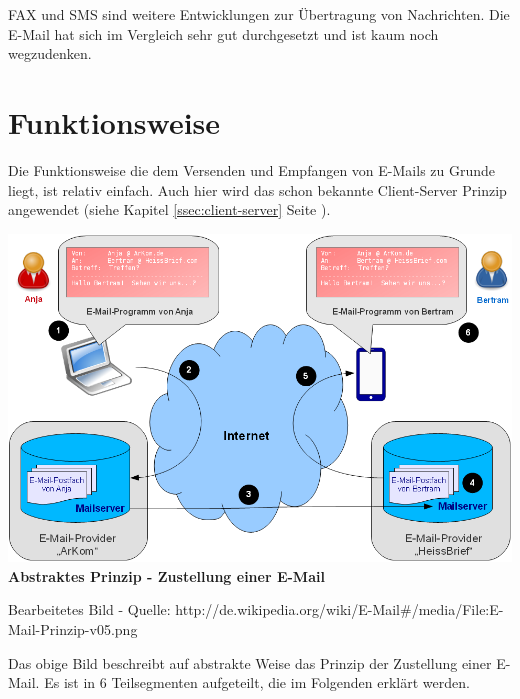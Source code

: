 \documentclass[12pt,a4paper]{report}
\begin{document}
\begin{onehalfspace}
FAX und SMS sind weitere Entwicklungen zur Übertragung von Nachrichten. Die E-Mail hat sich im Vergleich sehr gut durchgesetzt und ist kaum noch wegzudenken. 
\section{Funktionsweise}
Die Funktionsweise die dem Versenden und Empfangen von E-Mails zu Grunde liegt, ist relativ einfach. Auch hier wird das schon bekannte Client-Server Prinzip angewendet (siehe Kapitel \ref{ssec:client-server} Seite \pageref{ssec:client-server}).\\

\begin{center}
\includegraphics[scale=0.6]{../docs/lyaton/graphics/E-Mail-Prinzip.png}\\
\textbf{Abstraktes Prinzip - Zustellung einer E-Mail}\\
\begin{scriptsize}
Bearbeitetes Bild - Quelle: http://de.wikipedia.org/wiki/E-Mail\#/media/File:E-Mail-Prinzip-v05.png
\end{scriptsize}
\end{center}
\vspace{0.5cm}

Das obige Bild beschreibt auf abstrakte Weise das Prinzip der Zustellung einer E-Mail. Es ist in 6 Teilsegmenten aufgeteilt, die im Folgenden erklärt werden.


\end{onehalfspace}
\end{document}
